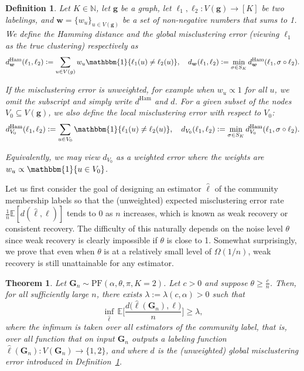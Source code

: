 \documentclass[twoside,11pt]{article}
\newtheorem{thy}[theorem]{Theorem}
\newtheorem{defin}[theorem]{Definition}
\theoremstyle{remark}
\begin{document}
\begin{defin}
\label{defin mismatch}
Let $K \in \mathbb{N}$, let $\bm{g}$ be a graph, let $\ell_1, {\ell}_2 :V(\bm{g}) \rightarrow [K]$ be two labelings, and $\bm{w} = \{ w_u \}_{u \in V(\bm{g})}$ be a set of non-negative numbers that sums to 1. We define the Hamming distance and the global misclustering error (viewing $\ell_1$ as the true clustering) respectively as
%
\begin{equation*}    
d^{\mathrm{Ham}}_{\bm{w}}({\ell}_1,\ell_2):=\sum_{u\in V\left(g\right)} w_u \mathbbm{1}\{{\ell}_1(u)\neq \ell_2(u)\},\quad d_{\bm{w}}({\ell}_1,\ell_2) := \min_{\sigma \in S_K} d^{\mathrm{Ham}}_{\bm{w}}({\ell}_1, \sigma \circ \ell_2). 
\end{equation*}

If the misclustering error is unweighted, for example when $w_u \propto 1$ for all $u$, we omit the subscript and simply write $d^{\text{Ham}}$ and $d$. For a given subset of the nodes $V_0 \subseteq V(\bm{g})$, we also define the \emph{local} misclustering error with respect to $V_0$:
%
\begin{equation*}    d^{\mathrm{Ham}}_{V_0}({\ell}_1,\ell_2):=\sum_{u\in V_0} \mathbbm{1}\{{\ell}_1(u)\neq \ell_2(u)\}, \quad d_{V_0}({\ell}_1,\ell_2) := \min_{\sigma \in S_K} d^{\mathrm{Ham}}_{V_0}({\ell}_1, \sigma \circ \ell_2). 
\end{equation*}

Equivalently, we may view $d_{V_0}$ as a weighted error where the weights are $w_u \propto \mathbbm{1}\{ u \in V_0 \}$. 
\end{defin}


Let us first consider the goal of designing an estimator $\hat{\ell}$ of the community membership labels so that the (unweighted) expected misclustering error rate $\frac{1}{n} \mathbb{E}[ d(\hat{\ell}, \ell)]$ tends to 0 as $n$ increases, which is known as weak recovery or consistent recovery. The difficulty of this naturally depends on the noise level $\theta$ since weak recovery is clearly impossible if $\theta$ is close to 1. Somewhat surprisingly, we prove that even when $\theta$ is at a relatively small level of $\Omega(1/n)$, weak recovery is still unattainable for any estimator. 

\begin{thy}
\label{thm: impossible}
Let $\boldsymbol{G}_{n} \sim \mathrm{PF}(\alpha, \theta, \pi, K=2)$. Let $c > 0$ and suppose $\theta \geq \frac{c}{n}$. Then, for all sufficiently large $n$, there exists $\lambda := \lambda(c, \alpha) > 0$ such that 
\begin{equation*}
    \inf_{\hat{\ell}}  \, \mathbb{E}\Biggl[ \frac{d\bigl(\hat{\ell}(\mathbf{G}_n), \ell\bigr)}{n}\Biggr]\geq \lambda,
\end{equation*}
where the infimum is taken over all estimators of the community label, that is, over all function that on input $\boldsymbol{G}_{n}$ outputs a labeling function $\hat{\ell}(\mathbf{G}_n): V(\mathbf{G}_n) \rightarrow \{1, 2\}$, and where $d$ is the (unweighted) global misclustering error introduced in Definition~\ref{defin mismatch}.
\end{thy}
\end{document}
